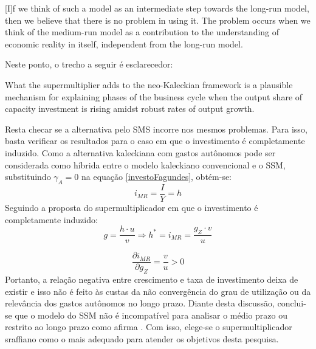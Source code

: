 \begin{citacao}
	
	[I]f we think of such a model as an intermediate step towards the long-run model, then we
	believe that there is no problem in using it. The problem occurs when we think of the medium-run
	model as a contribution to the understanding of economic reality in itself, independent from the long-run model.
\end{citacao}
Neste ponto, o trecho a seguir é esclarecedor:

\begin{citacao}
	What the supermultiplier adds to the neo-Kaleckian framework is a plausible mechanism for explaining phases
	of the business cycle when the output share of capacity investment is rising amidst robust rates of output growth. \cite[p.~9]{fiebiger_trend_2017}
\end{citacao}

Resta checar se a alternativa pelo SMS incorre nos mesmos problemas. Para isso, basta verificar os resultados para o caso em que o investimento é completamente induzido. Como a alternativa kaleckiana com gastos autônomos pode ser considerada como híbrida entre o modelo kaleckiano convencional e o SSM, substituindo $\gamma_A = 0$ na equação \ref{investoFagundes}, obtém-se:
$$
i_{MR} = \frac{I}{Y} =  h
$$
Seguindo a proposta do supermultiplicador em que o investimento é completamente induzido:
$$
g = \frac{h\cdot u}{v} \Rightarrow h^* = i_{MR} = \frac{g_Z\cdot v}{u}
$$

$$
\frac{\partial i_{MR}}{\partial g_Z} = \frac{v}{u} > 0
$$
Portanto, a relação negativa entre crescimento e taxa de investimento deixa de existir e isso não é feito às custas da não convergência do grau de utilização ou da relevância dos gastos autônomos no longo prazo. 
Diante desta discussão, conclui-se que o modelo do SSM não é incompatível para analisar o médio prazo ou restrito ao longo prazo como afirma \textcite{nikiforos_comments_2018}. Com isso, elege-se o supermultiplicador sraffiano como o mais adequado para atender os objetivos desta pesquisa. 
 
